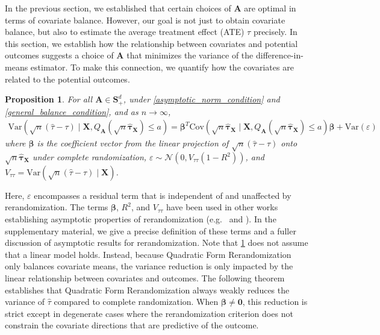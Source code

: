 \documentclass[11pt,twoside]{article}
\newtheorem{proposition}{Proposition}
\theoremstyle{definition}
\theoremstyle{remark}
\begin{document}
In the previous section, we established that certain choices of $\mathbf{A}$ are optimal in terms of covariate balance. However, our goal is not just to obtain covariate balance, but also to estimate the average treatment effect (ATE) $\tau$ precisely. In this section, we establish how the relationship between covariates and potential outcomes suggests a choice of $\mathbf{A}$ that minimizes the variance of the difference-in-means estimator. To make this connection, we quantify how the covariates are related to the potential outcomes. 
\begin{proposition} \label{variance_of_tauhat}
    For all $\mathbf{A} \in \mathbf{S}^d_{+}$, under \cref{asymptotic_norm_condition} and \cref{general_balance_condition}, and as $n \to \infty$,
    \begin{align*}
        \text{Var}\left(\sqrt{n}(\widehat{\tau} - \tau) \mid \mathbf{X}, Q_{\mathbf{A}}(\sqrt{n} \widehat{\bm{\tau}}_{\mathbf{X}}) \leq a \right) = \bm{\beta}^T \text{Cov}\left( \sqrt{n} \widehat{\bm{\tau}}_{\mathbf{X}} \mid \mathbf{X}, Q_{\mathbf{A}}(\sqrt{n} \widehat{\bm{\tau}}_{\mathbf{X}}) \leq a  \right) \bm{\beta} + \text{Var}( \varepsilon )
    \end{align*}
    where $\bm{\beta}$ is the coefficient vector from the linear projection of $\sqrt{n}(\widehat{\tau}-\tau)$ onto $\sqrt{n}\widehat{\bm{\tau}}_{\mathbf{X}}$ under complete randomization, $\varepsilon \sim \mathcal{N}(0, V_{\tau \tau}(1 - R^2))$, and $V_{\tau \tau} = \text{Var}(\sqrt{n}(\widehat{\tau} - \tau) \mid \mathbf{X})$.
\end{proposition}
Here, $\varepsilon$ encompasses a residual term that is independent of and unaffected by rerandomization. The terms $\bm{\beta}$, $R^2$, and $V_{\tau \tau}$ have been used in other works establishing asymptotic properties of rerandomization (e.g.\ \cite{li2018asymptotic} and \cite{lu2023design}). In the supplementary material, we give a precise definition of these terms and a fuller discussion of asymptotic results for rerandomization. Note that \cref{variance_of_tauhat} does not assume that a linear model holds. Instead, because Quadratic Form Rerandomization only balances covariate means, the variance reduction is only impacted by the linear relationship between covariates and outcomes. The following theorem establishes that Quadratic Form Rerandomization always weakly reduces the variance of $\widehat{\tau}$ compared to complete randomization. When $\bm{\beta} \neq \mathbf{0}$, this reduction is strict except in degenerate cases where the rerandomization criterion does not constrain the covariate directions that are predictive of the outcome.
\end{document}
